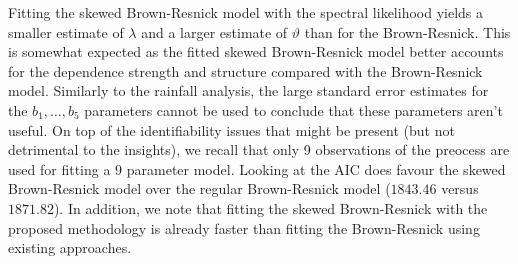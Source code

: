 \documentclass[12pt]{article}
\begin{document}
%
Fitting the skewed Brown-Resnick model with the spectral likelihood yields a smaller estimate of $\lambda$ and  a larger estimate of $\vartheta$ than for the Brown-Resnick. This is somewhat expected as the fitted skewed Brown-Resnick model better accounts for the dependence strength and structure compared with the Brown-Resnick model. Similarly to the rainfall analysis, the large standard error estimates for the $b_1, \ldots, b_5$ parameters cannot be used to conclude that these parameters aren't useful. On top of the identifiability issues that might be present (but not detrimental to the insights), we recall that only 9 observations of the preocess are used for fitting a 9 parameter model. Looking at the AIC does favour the skewed Brown-Resnick model over the regular Brown-Resnick model ($1843.46$ versus $1871.82$). 
In addition, we note that fitting the skewed Brown-Resnick with the proposed methodology is already faster than fitting the Brown-Resnick using existing approaches.

\end{document}
